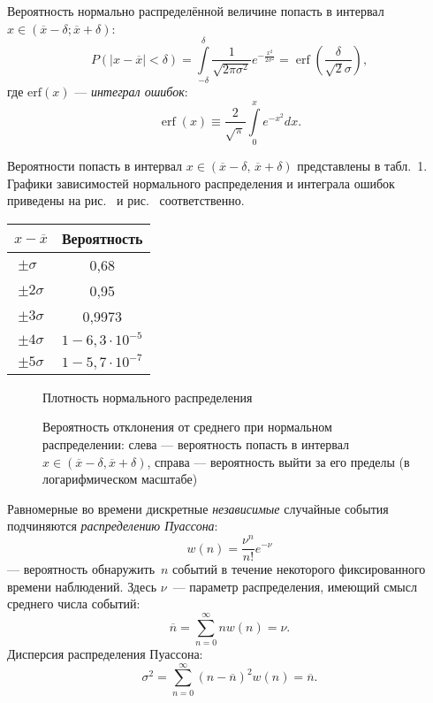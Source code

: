 \begin{booksupplement}
Вероятность нормально распределённой величине попасть в интервал
$x\in (\overline{x}-\delta; \overline{x}+\delta)$:
\[
P({|x-\overline{x}|<\delta})  = 
\int\limits_{-\delta}^{\delta} \frac{1}{\sqrt{2\pi \sigma^2}} e^{-\frac{x^2}{2\sigma^2}} = 
\mathop{\mathrm{erf}}\left(\frac{\delta}{\sqrt{2}\sigma}\right),
\]
где $\mathrm{erf}(x)$ --- \emph{интеграл ошибок}:
\[
\mathop{\mathrm{erf}} (x) \equiv \frac{2}{\sqrt{\pi}} \int\limits_0^x e^{-x^2} dx.
\]

Вероятности попасть в интервал $x\in(\overline{x}-\delta,\,\overline{x}+\delta)$ 
представлены в табл.~1.
Графики зависимостей нормального распределения и интеграла ошибок
приведены на рис.~ и рис.~ соответственно.
\begin{table}[h!]\centering
    \small
    \begin{tabular}{cc}
        $x-\overline{x}$ & Вероятность \\ \hline
        $\pm \sigma\phantom{0}$ & 0,68 \\
        $\pm 2\sigma$ & 0,95 \\
        $\pm 3\sigma$ & 0,9973 \\
        $\pm 4\sigma$ & $1-6,3\cdot 10^{-5}$ \\
        $\pm 5\sigma$ & $1-5,7\cdot 10^{-7}$ \\
    \end{tabular}
\end{table}    

\begin{figure}\centering
    \caption{Плотность нормального распределения}
\end{figure}

\begin{figure}\centering\small
    \caption{Вероятность отклонения  от среднего при нормальном распределении: 
    слева --- вероятность попасть в интервал $x\in(\overline{x}-\delta,\overline{x}+\delta)$, справа ---
     вероятность выйти за его пределы (в логарифмическом масштабе)}
\end{figure}

Равномерные во времени дискретные \emph{независимые} случайные события 
подчиняются \emph{распределению Пуассона}:
\[
w(n) = \frac{\nu^n}{n!}e^{-\nu}
\]
--- вероятность обнаружить~$n$ событий в течение некоторого
фиксированного времени наблюдений. Здесь $\nu$~--- параметр распределения,
имеющий смысл среднего числа событий:
\[
\overline{n} = \sum\limits_{n=0}^{\infty} n w(n) = \nu.
\]
Дисперсия распределения Пуассона:
\[
\sigma^2 = \sum\limits_{n=0}^{\infty} (n-\overline{n})^2 w(n) = \overline{n}.
\]


\end{booksupplement}

